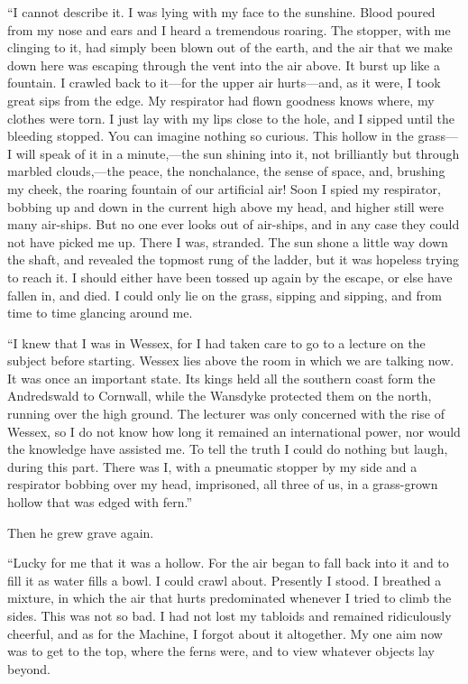 ``I cannot describe it. I was lying with my face to the sunshine. Blood poured from my nose and ears and I heard a tremendous roaring. The stopper, with me clinging to it, had simply been blown out of the earth, and the air that we make down here was escaping through the vent into the air above. It burst up like a fountain. I crawled back to it---for the upper air hurts---and, as it were, I took great sips from the edge. My respirator had flown goodness knows where, my clothes were torn. I just lay with my lips close to the hole, and I sipped until the bleeding stopped. You can imagine nothing so curious. This hollow in the grass---I will speak of it in a minute,---the sun shining into it, not brilliantly but through marbled clouds,---the peace, the nonchalance, the sense of space, and, brushing my cheek, the roaring fountain of our artificial air! Soon I spied my respirator, bobbing up and down in the current high above my head, and higher still were many air-ships. But no one ever looks out of air-ships, and in any case they could not have picked me up. There I was, stranded. The sun shone a little way down the shaft, and revealed the topmost rung of the ladder, but it was hopeless trying to reach it. I should either have been tossed up again by the escape, or else have fallen in, and died. I could only lie on the grass, sipping and sipping, and from time to time glancing around me.

``I knew that I was in Wessex, for I had taken care to go to a lecture on the subject before starting. Wessex lies above the room in which we are talking now. It was once an important state. Its kings held all the southern coast form the Andredswald to Cornwall, while the Wansdyke protected them on the north, running over the high ground. The lecturer was only concerned with the rise of Wessex, so I do not know how long it remained an international power, nor would the knowledge have assisted me. To tell the truth I could do nothing but laugh, during this part. There was I, with a pneumatic stopper by my side and a respirator bobbing over my head, imprisoned, all three of us, in a grass-grown hollow that was edged with fern.''

Then he grew grave again.

``Lucky for me that it was a hollow. For the air began to fall back into it and to fill it as water fills a bowl. I could crawl about. Presently I stood. I breathed a mixture, in which the air that hurts predominated whenever I tried to climb the sides. This was not so bad. I had not lost my tabloids and remained ridiculously cheerful, and as for the Machine, I forgot about it altogether. My one aim now was to get to the top, where the ferns were, and to view whatever objects lay beyond.

